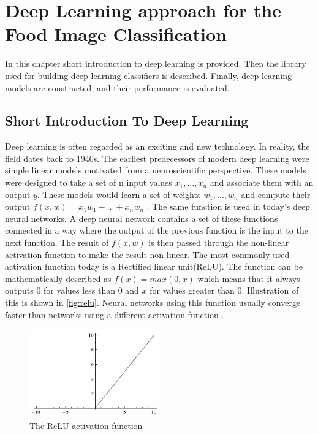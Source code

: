 \chapter{Deep Learning approach for the Food Image Classification}

In this chapter short introduction to deep learning is provided. Then the library used for building deep learning classifiers is described. Finally, deep learning models are constructed, and their performance is evaluated.


\section{Short Introduction To Deep Learning}

Deep learning is often regarded as an exciting and new technology. In reality, the field dates back to 1940s. The earliest predecessors of modern deep learning were simple linear models motivated from a neuroscientific perspective. These models were designed to take a set of n input values \(x_1,...,x_n\) and associate them with an output \(y\). These models would learn a set of weights \(w_1,...,w_n \) and compute their output \(f(x,w)=x_1 w_1+...+x_n w_n\) \cite{Goodfellow-et-al-2017}. The same function is used in today’s deep neural networks. A deep neural network contains a set of these functions connected in a way where the output of the previous function is the input to the next function. The result of \(f(x,w)\) is then passed through the non-linear activation function to make the result non-linear. The most commonly used activation function today is a Rectified linear unit(ReLU). The function can be mathematically described as \(f(x)=max(0,x)\) which means that it always outputs 0 for values less than 0 and \(x\) for values greater than 0. Illustration of this is shown in \autoref{fig:relu}. Neural networks using this function usually converge faster than networks using a different activation function \citep{relu}.

\begin{figure}[h]
\centering
\includegraphics[width=0.5\textwidth]{Figures/relu.jpeg}
\caption{The ReLU activation function \citep{231nn}}
\label{fig:relu}
\end{figure}


